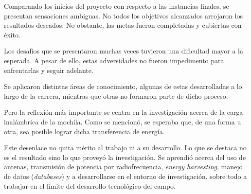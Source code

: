
Comparando los inicios del proyecto con respecto a las instancias finales, se presentan sensaciones ambiguas. No todos los objetivos alcanzados arrojaron los resultados deseados. No obstante, las metas fueron completadas y cubiertas con éxito.

Los desafíos que se presentaron muchas veces tuvieron una dificultad mayor a la esperada. A pesar de ello, estas adversidades no fueron impedimento para enfrentarlas y seguir adelante.

Se aplicaron distintas áreas de conocimiento, algunas de estas desarrolladas a lo largo de la carrera, mientras que otras no formaron parte de dicho proceso.

Pero la reflexión más importante se centra en la investigación acerca de la carga inalámbrica de la mochila. Como se mencionó, se esperaba que, de una forma u otra, sea posible lograr dicha transferencia de energía.

Este desenlace no quita mérito al trabajo ni a su desarrollo. Lo que se destaca no es el resultado sino lo que proveyó la investigación. Se aprendió acerca del uso de antenas, transmisión de potencia por radiofrecuencia, \textit{energy harvesting}, manejo de datos (\textit{databases}) y a desarrollarse en el entorno de investigación, sobre todo a trabajar en el límite del desarrollo tecnológico del campo.
